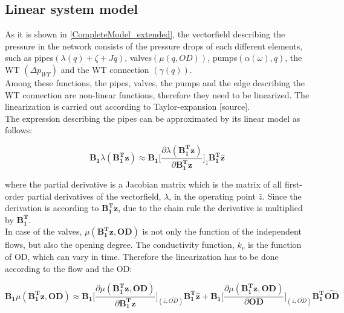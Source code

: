 %
%
%
%

\subsection{Linear system model}
 \label{SystemLin}
 
As it is shown in \eqref{CompleteModel_extended}, the vectorfield describing the pressure in the network consists of the pressure drops of each different elements, such as pipes$(\lambda(q) + \zeta + J \dot{q})$, valves$(\mu(q,OD))$, pumps$(\alpha(\omega), q)$, the WT $(\Delta p_{WT})$ and the WT connection $(\gamma(q))$.
\\
Among these functions, the pipes, valves, the pumps and the edge describing the WT connection are non-linear functions, therefore they need to be linearized. The linearization is carried out according to Taylor-expansion [source].
\\
The expression describing the pipes can be approximated by its linear model as follows:

\begin{equation}
  \pmb{B_1} \lambda(\pmb{{B_1^{T}}}\pmb{z}) \approx \pmb{B_1} \bigg[ \frac{\partial{\lambda(\pmb{{B_1^{T}}}\pmb{z})}}{{\partial{\pmb{{B_1^{T}}}\pmb{z}}}}   \bigg]_{\bar{z}} \pmb{{B_1^{T}}}\pmb{\hat{z}}
\label{lambda_lin}
\end{equation}

where the partial derivative is a Jacobian matrix which is the matrix of all first-order partial derivatives of the vectorfield, $\lambda$, in the operating point $\bar{z}$. Since the derivation is according to $\pmb{{B_1^{T}}}\pmb{z}$, due to the chain rule the derivative is multiplied by $\pmb{{B_1^{T}}}$. 
\\
In case of the valves, $\mu(\pmb{{B_1^{T}}}\pmb{z}, \pmb{OD})$ is not only the function of the independent flows, but also the opening degree. The conductivity function, $k_v$ is the function of OD, which can vary in time. Therefore the linearization has to be done according to the flow and the OD: 

\begin{equation}
  \pmb{B_1} \mu(\pmb{{B_1^{T}}}\pmb{z}, \pmb{OD}) \approx 
  \pmb{B_1} \bigg[ \frac{\partial{\mu(\pmb{{B_1^{T}}}\pmb{z}, \pmb{OD})}}{{\partial{\pmb{{B_1^{T}}}\pmb{z}}}}  \bigg]_{(\bar{z}, \bar{OD})} \pmb{{B_1^{T}}} \pmb{\hat{z}}
 +  \pmb{B_1} \bigg[ \frac{\partial{\mu(\pmb{{B_1^{T}}}\pmb{z}, \pmb{OD})}}{{\partial{\pmb{OD}}}}  \bigg]_{(\bar{z}, \bar{OD})} \pmb{{B_1^{T}}} \pmb{\hat{OD}}
\label{mu_lin}
\end{equation}

